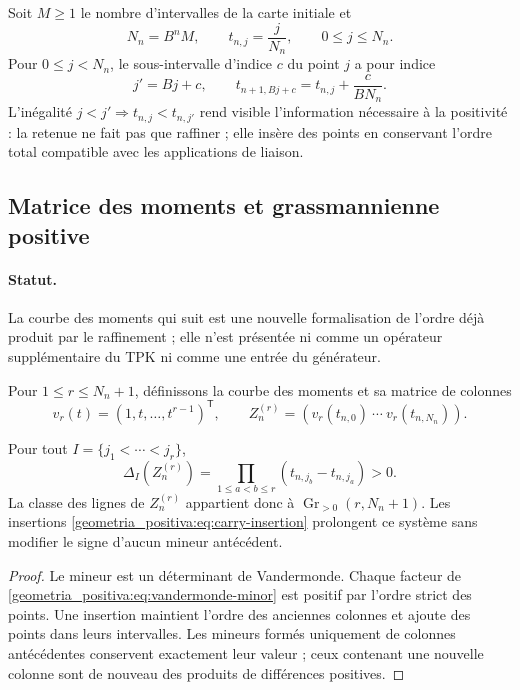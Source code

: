 Soit \(M\ge1\) le nombre d’intervalles de la carte initiale et
\begin{equation}
 N_n=B^nM,\qquad t_{n,j}=\frac{j}{N_n},\qquad 0\le j\le N_n.
 \label{geometria_positiva:eq:ordered-carry-points}
\end{equation}
Pour \(0\le j<N_n\), le sous-intervalle d’indice \(c\) du point \(j\) a pour indice
\begin{equation}
 j'=Bj+c,\qquad
 t_{n+1,Bj+c}=t_{n,j}+\frac{c}{BN_n}.
 \label{geometria_positiva:eq:carry-insertion}
\end{equation}
L’inégalité \(j<j'\Rightarrow t_{n,j}<t_{n,j'}\) rend visible l’information nécessaire à la positivité : la retenue ne fait pas que raffiner ; elle insère des points en conservant l’ordre total compatible avec les applications de liaison.

\subsection{Matrice des moments et grassmannienne positive}

\paragraph{Statut.}
La courbe des moments qui suit est une nouvelle formalisation de l’ordre déjà produit par le raffinement ; elle n’est présentée ni comme un opérateur supplémentaire du TPK ni comme une entrée du générateur.

Pour \(1\le r\le N_n+1\), définissons la courbe des moments et sa matrice de colonnes
\[
 v_r(t)=(1,t,\ldots,t^{r-1})^{\mathsf T},\qquad
 Z_n^{(r)}=(v_r(t_{n,0})\ \cdots\ v_r(t_{n,N_n})).
\]

\begin{theorem}
\label{geometria_positiva:thm:tpk-vandermonde-positive}
Pour tout \(I=\{j_1<\cdots<j_r\}\),
\begin{equation}
 \Delta_I(Z_n^{(r)})
 =\prod_{1\le a<b\le r}(t_{n,j_b}-t_{n,j_a})>0.
 \label{geometria_positiva:eq:vandermonde-minor}
\end{equation}
La classe des lignes de \(Z_n^{(r)}\) appartient donc à \(\operatorname{Gr}_{>0}(r,N_n+1)\). Les insertions \eqref{geometria_positiva:eq:carry-insertion} prolongent ce système sans modifier le signe d’aucun mineur antécédent.
\end{theorem}
\begin{proof}
Le mineur est un déterminant de Vandermonde. Chaque facteur de \eqref{geometria_positiva:eq:vandermonde-minor} est positif par l’ordre strict des points. Une insertion maintient l’ordre des anciennes colonnes et ajoute des points dans leurs intervalles. Les mineurs formés uniquement de colonnes antécédentes conservent exactement leur valeur ; ceux contenant une nouvelle colonne sont de nouveau des produits de différences positives.
\end{proof}

